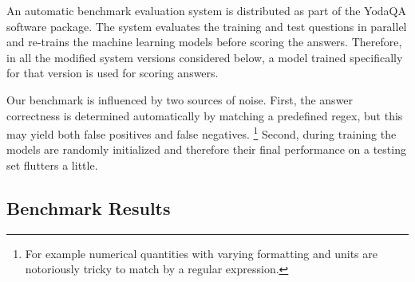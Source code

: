 \documentclass{poster15}
\begin{document}
An automatic benchmark evaluation system is distributed as part of the
YodaQA software package.  The system evaluates the training and test questions
in parallel and re-trains the machine learning models before scoring the answers.
Therefore, in all the modified system versions considered below, a model trained
specifically for that version is used for scoring answers.

Our benchmark is influenced by two sources of noise.
First, the answer correctness is determined automatically by matching a predefined regex,
but this may yield both false positives and false negatives.%
\footnote{For example numerical quantities with varying formatting and units are notoriously tricky to match by a regular expression.}
Second, during training the models are randomly initialized and therefore their final
performance on a testing set flutters a little.

\subsection{Benchmark Results}
\end{document}
